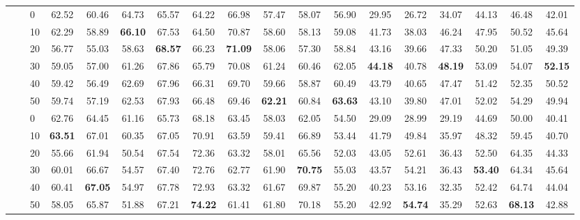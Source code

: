 \begin{table*}[!h]
{\begin{tabular}{lllccc|ccc|ccc|ccc|ccc}
\hline
\arrayrulecolor{gray}\cline{2-18}\arrayrulecolor{black}
\textbf{\multirow{12}{*}{Opinion Term}} & \textbf{\multirow{6}{*}{-}} & 0 & 62.52 & 60.46 & 64.73 & 65.57 & 64.22 & 66.98 & 57.47 & 58.07 & 56.90 & 29.95 & 26.72 & 34.07 & 44.13 & 46.48 & 42.01 \\ 
 \textbf{} & \textbf{} & 10 & 62.29 & 58.89 & \textbf{66.10} & 67.53 & 64.50 & 70.87 & 58.60 & 58.13 & 59.08 & 41.73 & 38.03 & 46.24 & 47.95 & 50.52 & 45.64 \\ 
 \textbf{} & \textbf{} & 20 & 56.77 & 55.03 & 58.63 & \textbf{68.57} & 66.23 & \textbf{71.09} & 58.06 & 57.30 & 58.84 & 43.16 & 39.66 & 47.33 & 50.20 & 51.05 & 49.39 \\ 
 \textbf{} & \textbf{} & 30 & 59.05 & 57.00 & 61.26 & 67.86 & 65.79 & 70.08 & 61.24 & 60.46 & 62.05 & \textbf{44.18} & 40.78 & \textbf{48.19} & 53.09 & 54.07 & \textbf{52.15} \\ 
 \textbf{} & \textbf{} & 40 & 59.42 & 56.49 & 62.69 & 67.96 & 66.31 & 69.70 & 59.66 & 58.87 & 60.49 & 43.79 & 40.65 & 47.47 & 51.42 & 52.35 & 50.52 \\ 
 \textbf{} & \textbf{} & 50 & 59.74 & 57.19 & 62.53 & 67.93 & 66.48 & 69.46 & \textbf{62.21} & 60.84 & \textbf{63.63} & 43.10 & 39.80 & 47.01 & 52.02 & 54.29 & 49.94 \\ 
 \arrayrulecolor{gray}\cline{2-18}\arrayrulecolor{black}
\textbf{} & \textbf{\multirow{6}{*}{SC}} & 0 & 62.76 & 64.45 & 61.16 & 65.73 & 68.18 & 63.45 & 58.03 & 62.05 & 54.50 & 29.09 & 28.99 & 29.19 & 44.69 & 50.00 & 40.41 \\ 
 \textbf{} & \textbf{} & 10 & \textbf{63.51} & 67.01 & 60.35 & 67.05 & 70.91 & 63.59 & 59.41 & 66.89 & 53.44 & 41.79 & 49.84 & 35.97 & 48.32 & 59.45 & 40.70 \\ 
 \textbf{} & \textbf{} & 20 & 55.66 & 61.94 & 50.54 & 67.54 & 72.36 & 63.32 & 58.01 & 65.56 & 52.03 & 43.05 & 52.61 & 36.43 & 52.50 & 64.35 & 44.33 \\ 
 \textbf{} & \textbf{} & 30 & 60.01 & 66.67 & 54.57 & 67.40 & 72.76 & 62.77 & 61.90 & \textbf{70.75} & 55.03 & 43.57 & 54.21 & 36.43 & \textbf{53.40} & 64.34 & 45.64 \\ 
 \textbf{} & \textbf{} & 40 & 60.41 & \textbf{67.05} & 54.97 & 67.78 & 72.93 & 63.32 & 61.67 & 69.87 & 55.20 & 40.23 & 53.16 & 32.35 & 52.42 & 64.74 & 44.04 \\ 
 \textbf{} & \textbf{} & 50 & 58.05 & 65.87 & 51.88 & 67.21 & \textbf{74.22} & 61.41 & 61.80 & 70.18 & 55.20 & 42.92 & \textbf{54.74} & 35.29 & 52.63 & \textbf{68.13} & 42.88 \\ 

\end{tabular}}
\end{table*}
